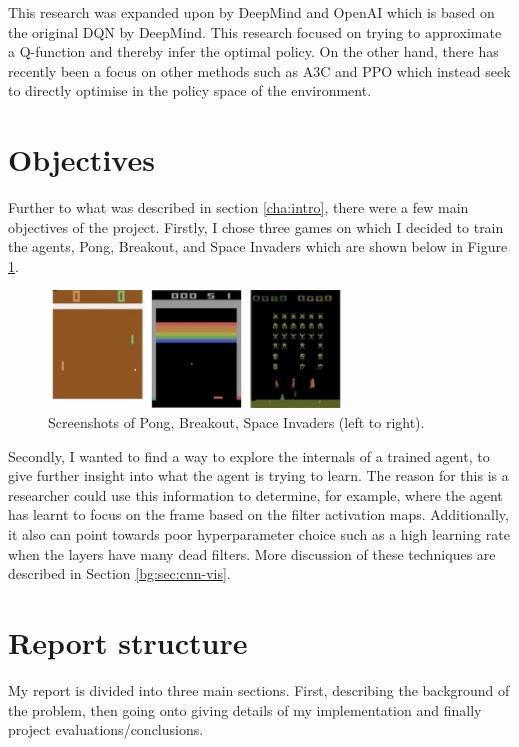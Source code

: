 This research was expanded upon by DeepMind and OpenAI which is based on the original DQN by DeepMind. This research focused on trying to approximate a Q-function and thereby infer the optimal policy. On the other hand, there has recently been a focus on other methods such as A3C and PPO which instead seek to directly optimise in the policy space of the environment.

\section{Objectives}
\label{intro:sec:obj}
Further to what was described in section \ref{cha:intro}, there were a few main objectives of the project. Firstly, I chose three games on which I decided to train the agents, Pong, Breakout, and Space Invaders which are shown below in Figure \ref{fig:atari-screenshot}.

\begin{figure}[htbp]
	\centering
	\includegraphics[width=0.7\textwidth]{chapters/chapter1/images/atari-combined.jpg}
	\caption{Screenshots of Pong, Breakout, Space Invaders (left to right).
		\label{fig:atari-screenshot}
	}
\end{figure}


Secondly, I wanted to find a way to explore the internals of a trained agent, to give further insight into what the agent is trying to learn. The reason for this is a researcher could use this information to determine, for example, where the agent has learnt to focus on the frame based on the filter activation maps. Additionally, it also can point towards poor hyperparameter choice such as a high learning rate when the layers have many dead filters. More discussion of these techniques are described in Section \ref{bg:sec:cnn-vis}.

\section{Report structure}
\label{intro:sec:report_struc}

My report is divided into three main sections. First, describing the background of the problem, then going onto giving details of my implementation and finally project evaluations/conclusions.